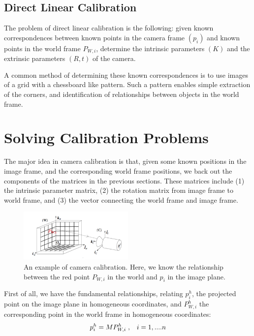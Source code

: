 \documentclass[]{article}
\begin{document}
\subsection{Direct Linear Calibration}
The problem of direct linear calibration is the following: given known correspondences between known points in the camera frame $(p_i)$ and known points in the world frame $P_{W,i}$, determine the intrinsic parameters $(K)$ and the extrinsic parameters $(R,t)$ of the camera.

A common method of determining these known correspondences is to use images of a grid with a chessboard like pattern. Such a pattern enables simple extraction of the corners, and identification of relationships between objects in the world frame. 

\section{Solving Calibration Problems}

The major idea in camera calibration is that, given some known positions in the image frame, and the corresponding world frame positions, we back out the components of the matrices in the previous sections. These matrices include (1) the intrinsic parameter matrix, (2) the rotation matrix from image frame to world frame, and (3) the vector connecting the world frame and image frame.\\

\begin{figure}[H]
\includegraphics[width=0.5\textwidth]{vik_image_4.png}
\centering
\caption{An example of camera calibration. Here, we know the relationship between the red point $P_{W,i}$ in the world and $p_i$ in the image plane.}
\label{fig:calibration}
\end{figure}


First of all, we have the fundamental relationships, relating $p_i^h$, the projected point on the image plane in homogeneous coordinates, and $P_{W,i}^h$ the corresponding point in the world frame in homogeneous coordinates:
\begin{equation}
    p_i^h = M P_{W,i}^{h}\hspace{1mm}, \hspace{3mm}i = 1,....n
\end{equation}
\end{document}
